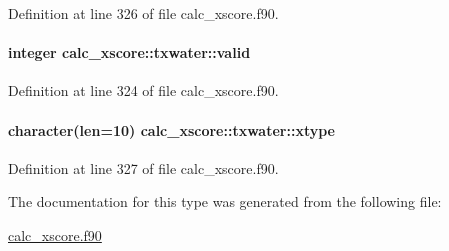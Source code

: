 Definition at line 326 of file calc\-\_\-xscore.\-f90.

\hypertarget{structcalc__xscore_1_1txwater_ac05a7c8bee5c381ef5d47281b92a1344}{
\paragraph[{valid}]{\setlength{\rightskip}{0pt plus 5cm}integer calc\-\_\-xscore\-::txwater\-::valid}}\label{structcalc__xscore_1_1txwater_ac05a7c8bee5c381ef5d47281b92a1344}


Definition at line 324 of file calc\-\_\-xscore.\-f90.

\hypertarget{structcalc__xscore_1_1txwater_a1dfeb15097110cc40e3df3e528601119}{
\paragraph[{xtype}]{\setlength{\rightskip}{0pt plus 5cm}character(len=10) calc\-\_\-xscore\-::txwater\-::xtype}}\label{structcalc__xscore_1_1txwater_a1dfeb15097110cc40e3df3e528601119}


Definition at line 327 of file calc\-\_\-xscore.\-f90.



The documentation for this type was generated from the following file\-:\begin{DoxyCompactItemize}
\item 
\hyperlink{calc__xscore_8f90}{calc\-\_\-xscore.\-f90}\end{DoxyCompactItemize}
